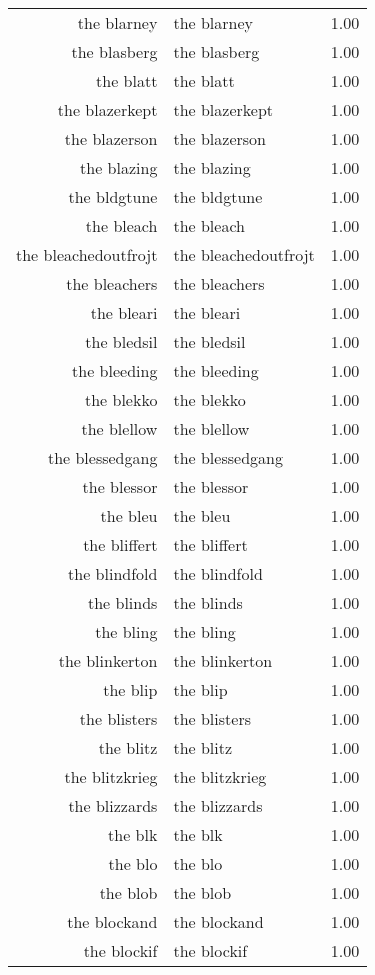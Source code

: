 \begin{table}[ht]
\begin{tabular}{rlr}
  the blarney & the blarney & 1.00 \\ 
  the blasberg & the blasberg & 1.00 \\ 
  the blatt & the blatt & 1.00 \\ 
  the blazerkept & the blazerkept & 1.00 \\ 
  the blazerson & the blazerson & 1.00 \\ 
  the blazing & the blazing & 1.00 \\ 
  the bldgtune & the bldgtune & 1.00 \\ 
  the bleach & the bleach & 1.00 \\ 
  the bleachedoutfrojt & the bleachedoutfrojt & 1.00 \\ 
  the bleachers & the bleachers & 1.00 \\ 
  the bleari & the bleari & 1.00 \\ 
  the bledsil & the bledsil & 1.00 \\ 
  the bleeding & the bleeding & 1.00 \\ 
  the blekko & the blekko & 1.00 \\ 
  the blellow & the blellow & 1.00 \\ 
  the blessedgang & the blessedgang & 1.00 \\ 
  the blessor & the blessor & 1.00 \\ 
  the bleu & the bleu & 1.00 \\ 
  the bliffert & the bliffert & 1.00 \\ 
  the blindfold & the blindfold & 1.00 \\ 
  the blinds & the blinds & 1.00 \\ 
  the bling & the bling & 1.00 \\ 
  the blinkerton & the blinkerton & 1.00 \\ 
  the blip & the blip & 1.00 \\ 
  the blisters & the blisters & 1.00 \\ 
  the blitz & the blitz & 1.00 \\ 
  the blitzkrieg & the blitzkrieg & 1.00 \\ 
  the blizzards & the blizzards & 1.00 \\ 
  the blk & the blk & 1.00 \\ 
  the blo & the blo & 1.00 \\ 
  the blob & the blob & 1.00 \\ 
  the blockand & the blockand & 1.00 \\ 
  the blockif & the blockif & 1.00 \\ 

\end{tabular}
\end{table}
